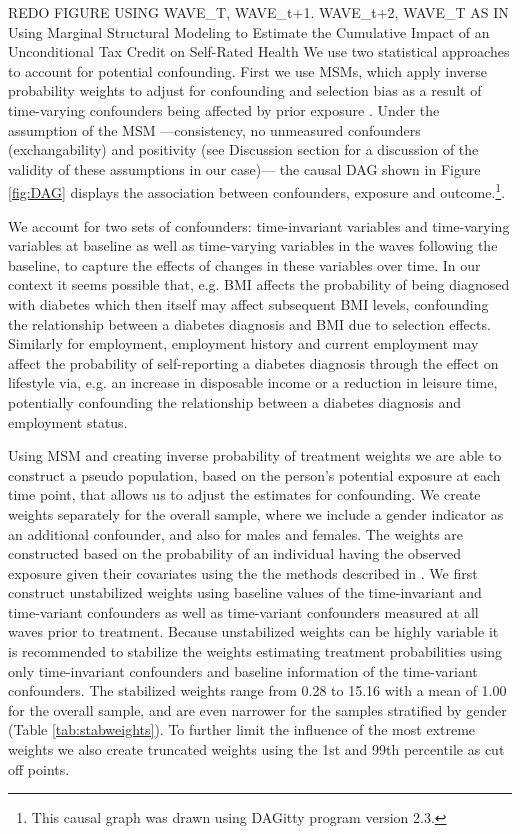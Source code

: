 REDO FIGURE USING WAVE\_T, WAVE\_t+1. WAVE\_t+2, WAVE\_T AS IN Using Marginal Structural Modeling to Estimate the Cumulative Impact of an Unconditional Tax Credit on Self-Rated Health
We use two statistical approaches to account for potential confounding. First we use \acp{MSM}, which apply inverse probability weights to adjust for confounding and selection bias as a result of time-varying confounders being affected by prior exposure \autocite{Robins2000}. Under the assumption of the \ac{MSM}\autocite{Robins2000} ---consistency, no unmeasured confounders (exchangability) and positivity (see Discussion section for a discussion of the validity of these assumptions in our case)--- the causal DAG shown in Figure \ref{fig:DAG} displays the association between confounders, exposure and outcome.\footnote{This causal graph was drawn using DAGitty program version 2.3.\autocite{Textor2011}}. 

We account for two sets of confounders: time-invariant variables and time-varying variables at baseline as well as time-varying variables in the waves following the baseline, to capture the effects of changes in these variables over time. In our context it seems possible that, e.g. \ac{BMI} affects the probability of being diagnosed with diabetes which then itself may affect subsequent \ac{BMI} levels, confounding the relationship between a diabetes diagnosis and \ac{BMI} due to selection effects. Similarly for employment, employment history and current employment may affect the probability of self-reporting a diabetes diagnosis through the effect on lifestyle via, e.g. an increase in disposable income or a reduction in leisure time, potentially confounding the relationship between a diabetes diagnosis and employment status. 

Using \ac{MSM} and creating inverse probability of treatment weights we are able to construct a pseudo population, based on the person's potential exposure at each time point, that allows us to adjust the estimates for confounding. We create weights separately for the overall sample, where we include a gender indicator as an additional confounder, and also for males and females. The weights are constructed based on the probability of an individual having the observed exposure given their covariates using the the methods described in \textcite{Cole2008}\autocite{Cole2008}. We first construct unstabilized weights using baseline values of the time-invariant and time-variant confounders as well as time-variant confounders measured at all waves prior to treatment. Because unstabilized weights can be highly variable it is recommended to stabilize the weights estimating treatment probabilities using only time-invariant confounders and baseline information of the time-variant confounders. The stabilized weights range from 0.28 to 15.16 with a mean of 1.00 for the overall sample, and are even narrower for the samples stratified by gender (Table \ref{tab:stabweights}). To further limit the influence of the most extreme weights we also create truncated weights using the 1st and 99th percentile as cut off points.

